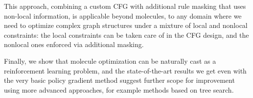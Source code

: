 \documentclass[11pt]{article}
\begin{document}
This approach, combining a custom CFG with additional rule masking that uses non-local information, is applicable beyond molecules, to any domain where we need to optimize complex graph structures under a mixture of local and nonlocal constraints: the local constraints can be taken care of in the CFG design, and the nonlocal ones enforced via additional masking.

Finally, we show that molecule optimization can be naturally cast as a reinforcement learning problem, and the state-of-the-art results we get even with the very basic policy gradient method suggest further scope for improvement using more advanced approaches, for example methods based on tree search.




\appendix
\end{document}

